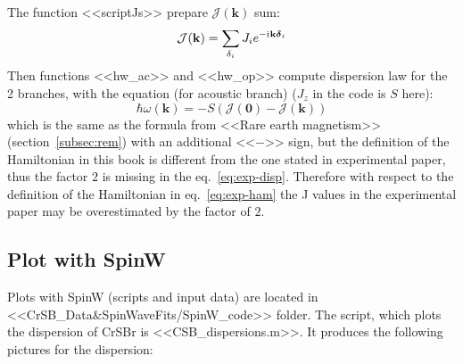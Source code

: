 \documentclass[a4paper,12pt]{article}
\newcommand{\iu}{\mathrm{i}\mkern1mu}
\begin{document}
            The function <<scriptJs>> prepare $\mathcal{J}(\mathbf{k})$ sum:
            \begin{equation}
                \mathcal{J}(\mathbf{k}) = \sum_{\delta_i} J_i e^{-\iu\mathbf{k}\boldsymbol{\delta}_i} 
            \end{equation}
            Then functions <<hw\_ac>> and <<hw\_op>> compute dispersion law for the 
            2 branches, with the equation (for acoustic branch) ($J_z$ in the code is $S$ here):
            \begin{equation}
                \hbar\omega(\mathbf{k}) = -S (\mathcal{J}(\mathbf{0}) - \mathcal{J}(\mathbf{k}))
                \label{eq:exp-disp}
            \end{equation}
            which is the same as the formula from <<Rare earth magnetism>>\cite{jensen1991rare} (section~\ref{subsec:rem}) with an additional <<$-$>> sign, 
            but the definition of the Hamiltonian in this book is different from the one stated 
            in experimental paper, thus the factor $2$ is missing in the eq.~\eqref{eq:exp-disp}.
            Therefore with respect to the definition of the Hamiltonian in eq.~\eqref{eq:exp-ham} 
            the J values in the experimental paper may be overestimated by the factor of $2$.

        \subsection{Plot with SpinW}
            Plots with SpinW (scripts and input data) are located in <<CrSB\_Data\&SpinWaveFits/SpinW\_code>> folder. 
            The script, which plots the dispersion of CrSBr is <<CSB\_dispersions.m>>. 
            It produces the following pictures for the dispersion:
\end{document}
